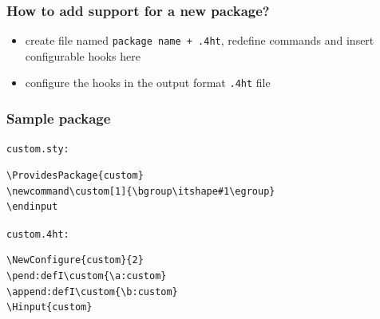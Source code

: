

% 


\begin{frame}
  \frametitle{How to add support for a new package?}
  \begin{itemize}
    \item create file named \texttt{package name + .4ht}, redefine commands and insert configurable hooks here
    \item configure the hooks in the output format \texttt{.4ht} file
  \end{itemize}
\end{frame}


\begin{frame}[fragile]
  \frametitle{Sample package  }
\texttt{custom.sty:}
  \begin{verbatim}
\ProvidesPackage{custom}
\newcommand\custom[1]{\bgroup\itshape#1\egroup}
\endinput
  \end{verbatim}
\medskip
\texttt{custom.4ht:}
  \begin{verbatim}
\NewConfigure{custom}{2}
\pend:defI\custom{\a:custom}
\append:defI\custom{\b:custom}
\Hinput{custom}
  \end{verbatim}
\end{frame}


